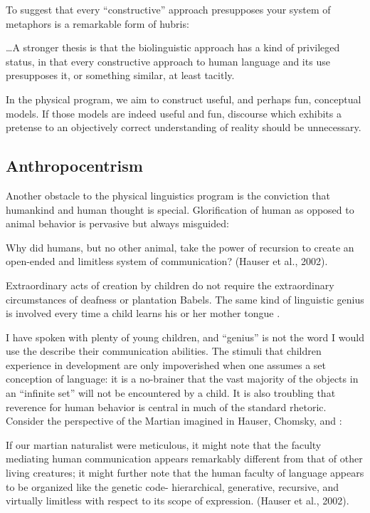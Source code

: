 To suggest that every “constructive” approach presupposes your system of metaphors is a remarkable form of hubris:

…A stronger thesis is that the biolinguistic approach has a kind of privileged status, in that every constructive approach to human language and its use presupposes it, or something similar, at least tacitly. \citep{Chomsky2001a}

  In the physical program, we aim to construct useful, and perhaps fun, conceptual models. If those models are indeed useful and fun, discourse which exhibits a pretense to an objectively correct understanding of reality should be unnecessary.

\subsection{Anthropocentrism}

Another obstacle to the physical linguistics program is the conviction that humankind and human thought is special. Glorification of human as opposed to animal behavior is pervasive but always misguided:

Why did humans, but no other animal, take the power of recursion to create an open-ended and limitless system of communication? (Hauser et al., 2002).

Extraordinary acts of creation by children do not require the extraordinary circumstances of deafness or plantation Babels. The same kind of linguistic genius is involved every time a child learns his or her mother tongue \citep{Pinker2003}.

  I have spoken with plenty of young children, and “genius” is not the word I would use the describe their communication abilities. The stimuli that children experience in development are only impoverished when one assumes a set conception of language: it is a no-brainer that the vast majority of the objects in an “infinite set” will not be encountered by a child. It is also troubling that reverence for human behavior is central in much of the standard rhetoric. Consider the perspective of the Martian imagined in Hauser, Chomsky, and \citet{Fitch2002}:

If our martian naturalist were meticulous, it might note that the faculty mediating human communication appears remarkably different from that of other living creatures; it might further note that the human faculty of language appears to be organized like the genetic code- hierarchical, generative, recursive, and virtually limitless with respect to its scope of expression. (Hauser et al., 2002).

